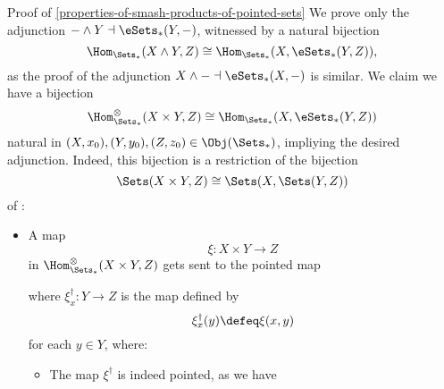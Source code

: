 \begin{Proof}{Proof of \cref{properties-of-smash-products-of-pointed-sets}}
    We prove only the adjunction $-\wedge Y\dashv\eSets_{*}(Y,-)$, witnessed by a natural bijection
    \[
        \Hom_{\Sets_{*}}(X\wedge Y,Z)%
        \cong%
        \Hom_{\Sets_{*}}(X,\eSets_{*}(Y,Z)),%
    \]%
    as the proof of the adjunction $X\wedge-\dashv\eSets_{*}(X,-)$ is similar. We claim we have a bijection
    \[
        \Hom^{\otimes}_{\Sets_{*}}(X\times Y,Z)%
        \cong%
        \Hom_{\Sets_{*}}(X,\eSets_{*}(Y,Z))%
    \]%
    natural in $(X,x_{0}),(Y,y_{0}),(Z,z_{0})\in\Obj(\Sets_{*})$, impliying the desired adjunction. Indeed, this bijection is a restriction of the bijection
    \[
        \Sets(X\times Y,Z)%
        \cong
        \Sets(X,\Sets(Y,Z))%
    \]%
    of :%
    \begin{itemize}
        \item A map
            \[
                \xi%
                \colon%
                X\times Y%
                \to%
                Z%
            \]%
            in $\Hom^{\otimes}_{\Sets_{*}}(X\times Y,Z)$ gets sent to the pointed map
            \begin{webcompile}
                \phantom{\xi^{\dagger}\colon}
            \end{webcompile}
            where $\xi^{\dagger}_{x}\colon Y\to Z$ is the map defined by
            \[
                \xi^{\dagger}_{x}(y)%
                \defeq%
                \xi(x,y)%
            \]%
            for each $y\in Y$, where:
            \begin{itemize}
                \item The map $\xi^{\dagger}$ is indeed pointed, as we have

\end{itemize}
\end{itemize}
\end{Proof}
